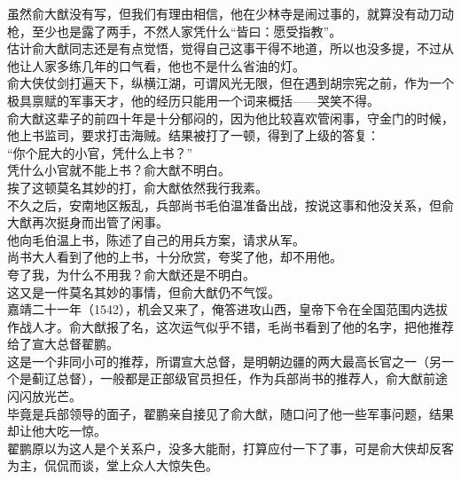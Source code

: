 \begin{multicols}{\theparacolNo}
虽然俞大猷没有写，但我们有理由相信，他在少林寺是闹过事的，就算没有动刀动枪，至少也是露了两手，不然人家凭什么“皆曰：愿受指教”。\\

估计俞大猷同志还是有点觉悟，觉得自己这事干得不地道，所以也没多提，不过从他让人家多练几年的口气看，他也不是什么省油的灯。\\

俞大侠仗剑打遍天下，纵横江湖，可谓风光无限，但在遇到胡宗宪之前，作为一个极具禀赋的军事天才，他的经历只能用一个词来概括——哭笑不得。\\

俞大猷这辈子的前四十年是十分郁闷的，因为他比较喜欢管闲事，守金门的时候，他上书监司，要求打击海贼。结果被打了一顿，得到了上级的答复：\\

“你个屁大的小官，凭什么上书？”\\

凭什么小官就不能上书？俞大猷不明白。\\

挨了这顿莫名其妙的打，俞大猷依然我行我素。\\

不久之后，安南地区叛乱，兵部尚书毛伯温准备出战，按说这事和他没关系，但俞大猷再次挺身而出管了闲事。\\

他向毛伯温上书，陈述了自己的用兵方案，请求从军。\\

尚书大人看到了他的上书，十分欣赏，夸奖了他，却不用他。\\

夸了我，为什么不用我？俞大猷还是不明白。\\

这又是一件莫名其妙的事情，但俞大猷仍不气馁。\\

嘉靖二十一年（1542），机会又来了，俺答进攻山西，皇帝下令在全国范围内选拔作战人才。俞大猷报了名，这次运气似乎不错，毛尚书看到了他的名字，把他推荐给了宣大总督翟鹏。\\

这是一个非同小可的推荐，所谓宣大总督，是明朝边疆的两大最高长官之一（另一个是蓟辽总督），一般都是正部级官员担任，作为兵部尚书的推荐人，俞大猷前途闪闪放光芒。\\

毕竟是兵部领导的面子，翟鹏亲自接见了俞大猷，随口问了他一些军事问题，结果却让他大吃一惊。\\

翟鹏原以为这人是个关系户，没多大能耐，打算应付一下了事，可是俞大侠却反客为主，侃侃而谈，堂上众人大惊失色。\\


\end{multicols}
